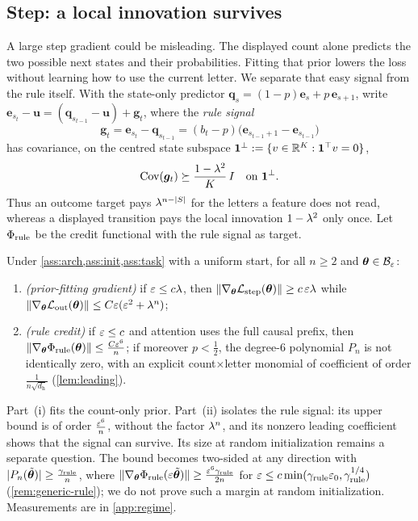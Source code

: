 \subsection{Step: a local innovation survives}
A large step gradient could be misleading. The displayed count alone predicts the two possible next states and their probabilities.
Fitting that prior lowers the loss without learning how to use the current letter. We separate that easy signal from the rule itself. With the
state-only predictor $\bm q_s=(1-p)\bm e_s+p\,\bm e_{s+1}$, write $\bm e_{s_t}-\bm u=(\bm q_{s_{t-1}}-\bm u)+\bm g_t$, where the
\emph{rule signal}
\[
 \bm g_t=\bm e_{s_t}-\bm q_{s_{t-1}}=(b_t-p)\bigl(\bm e_{s_{t-1}+1}-\bm e_{s_{t-1}}\bigr)
\]
has covariance, on the centred state subspace $\mathbf 1^\perp:=\{v\in\mathbb R^K:\mathbf 1^\top v=0\}$,
\begin{equation}
 \operatorname{Cov}(\bm g_t)\succeq\frac{1-\lambda^2}{K}\,I
 \quad\text{on }\mathbf 1^\perp.
 \label{eq:local-variation}
\end{equation}
Thus an outcome target pays $\lambda^{n-|S|}$ for the letters a feature does not read, whereas a displayed transition pays the
local innovation $1-\lambda^2$ only once. Let $\Phi_{\mathrm{rule}}$ be the credit
functional with the rule signal as target.

\begin{theorem}
\label{thm:separation}
Under \cref{ass:arch,ass:init,ass:task} with a uniform start, for all $n\ge2$ and $\bm\theta\in\mathcal B_{\varepsilon}$:
\begin{enumerate}[label=(\roman*),leftmargin=*,itemsep=0pt,topsep=2pt]
\item \emph{(prior-fitting gradient)} if $\varepsilon\le c\lambda$, then $\|\nabla_{\bm\theta}\mathcal L_{\mathrm{step}}(\bm\theta)\|\ge c\,\varepsilon\lambda$ while
$\|\nabla_{\bm\theta}\mathcal L_{\mathrm{out}}(\bm\theta)\|\le C\varepsilon(\varepsilon^2+\lambda^n)$;
\item \emph{(rule credit)} if $\varepsilon\le c$ and attention uses the full causal prefix, then $\|\nabla_{\bm\theta}\Phi_{\mathrm{rule}}(\bm\theta)\|\le \frac{C\varepsilon^6}{n}$; if
moreover $p<\tfrac{1}{2}$, the degree-$6$ polynomial $P_n$ is not identically zero, with an explicit count$\times$letter monomial of
coefficient of order $\frac{1}{n\sqrt{d_{\mathrm h}}}$
(\cref{lem:leading}).
\end{enumerate}
\end{theorem}

Part~(i) fits the count-only prior. Part~(ii) isolates the rule signal: its upper bound is of order $\frac{\varepsilon^6}{n}$, without
the factor $\lambda^n$, and its nonzero leading coefficient shows that the signal can survive. Its size at random initialization
remains a separate question. The bound becomes two-sided at any direction with
$|P_n(\tilde{\bm\theta})|\ge\frac{\gamma_{\mathrm{rule}}}{n}$, where $\|\nabla_{\bm\theta}\Phi_{\mathrm{rule}}(\varepsilon\tilde{\bm\theta})\|\ge\frac{\varepsilon^6\gamma_{\mathrm{rule}}}{2n}$ for
$\varepsilon\le c\min(\gamma_{\mathrm{rule}}\varepsilon_0,\gamma_{\mathrm{rule}}^{1/4})$ (\cref{rem:generic-rule}); we do not prove such a margin at random
initialization. Measurements are in \cref{app:regime}.

